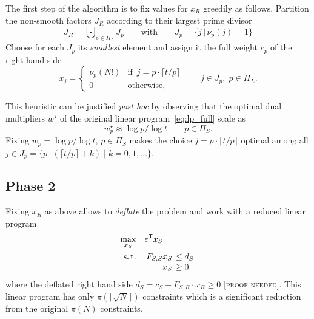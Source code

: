 \documentclass[12pt,a4paper,reqno]{amsart}
\numberwithin{equation}{section}
\begin{document}
The first step of the algorithm is to fix values for $x_R$ greedily as
follows. Partition the non-smooth factors $J_R$ according to their largest
prime divisor
\begin{equation*}
  J_R = \bigcupdot_{p \in \Pi_L} J_p \qquad \mathrm{with} \qquad J_p = \{ j \,|\, \nu_p(j) = 1 \}
\end{equation*}
Choose for each $J_p$ its \emph{smallest} element and assign it the full weight
$c_p$ of the right hand side
\begin{equation*}
  x_j =
  \begin{cases}
    \nu_p(N!) & \text{if} \enspace j = p \cdot \lceil t/p \rceil \\
    0         & \text{otherwise,}
  \end{cases}
  \qquad j \in J_p, \; p \in \Pi_L.
\end{equation*}

This heuristic can be justified \emph{post hoc} by observing that the optimal
dual multipliers $w^\star$ of the original linear program~\eqref{eq:lp_full}
scale as
\begin{equation*}
  w^\star_p \approx \log{p} / \log{t} \qquad p \in \Pi_S.
\end{equation*}
Fixing $w_p = \log{p} / \log{t}$, $p \in \Pi_S$ makes the choice $j = p \cdot
\lceil t/p \rceil$ optimal among all $j \in J_p = \{ p \cdot (\lceil t/p \rceil
+ k) \;|\; k=0, 1, \ldots \}$.

\subsection*{Phase 2}

Fixing $x_R$ as above allows to \emph{deflate} the problem and work with a
reduced linear program
\begin{equation}
\label{eq:lp_dfltd}
  \begin{aligned}
    \max_{x_S}      \quad & e^\mathsf{T} x_S \\
    \mathrm{s.\,t.} \quad & \arraycolsep2pt\begin{array}[t]{rl}
                                F_{S,S} x_S & \leq d_S \\
                                        x_S & \geq 0.
                            \end{array}
  \end{aligned}
\end{equation}
where the deflated right hand side $d_S = c_S - F_{S,R} \cdot x_R \geq 0$
\textsc{\tiny [proof needed]}. This linear program has only $\pi(\lceil
\sqrt{N} \rceil)$ constraints which is a significant reduction from the
original $\pi(N)$ constraints.
\end{document}
